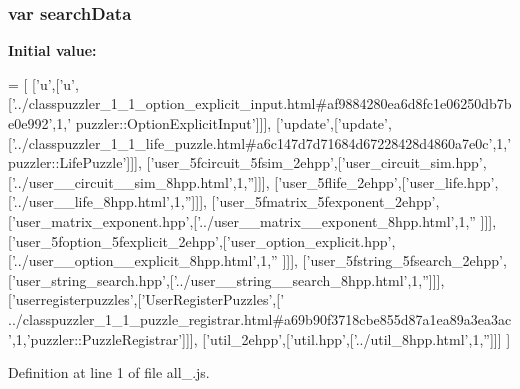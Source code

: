 \subsubsection[{search\+Data}]{\setlength{\rightskip}{0pt plus 5cm}var search\+Data}\label{a00043_ad01a7523f103d6242ef9b0451861231e}
{\bfseries Initial value\+:}
\begin{DoxyCode}
=
[
  [\textcolor{charliteral}{'u'},[\textcolor{charliteral}{'u'},[\textcolor{stringliteral}{'../classpuzzler\_1\_1\_option\_explicit\_input.html#af9884280ea6d8fc1e06250db7be0e992'},1,\textcolor{stringliteral}{'
      puzzler::OptionExplicitInput'}]]],
  [\textcolor{stringliteral}{'update'},[\textcolor{stringliteral}{'update'},[\textcolor{stringliteral}{'../classpuzzler\_1\_1\_life\_puzzle.html#a6c147d7d71684d67228428d4860a7e0c'},1,\textcolor{stringliteral}{'
      puzzler::LifePuzzle'}]]],
  [\textcolor{stringliteral}{'user\_5fcircuit\_5fsim\_2ehpp'},[\textcolor{stringliteral}{'user\_circuit\_sim.hpp'},[\textcolor{stringliteral}{'../user\_\_circuit\_\_sim\_8hpp.html'},1,\textcolor{stringliteral}{''}]]],
  [\textcolor{stringliteral}{'user\_5flife\_2ehpp'},[\textcolor{stringliteral}{'user\_life.hpp'},[\textcolor{stringliteral}{'../user\_\_life\_8hpp.html'},1,\textcolor{stringliteral}{''}]]],
  [\textcolor{stringliteral}{'user\_5fmatrix\_5fexponent\_2ehpp'},[\textcolor{stringliteral}{'user\_matrix\_exponent.hpp'},[\textcolor{stringliteral}{'../user\_\_matrix\_\_exponent\_8hpp.html'},1,\textcolor{stringliteral}{''}
      ]]],
  [\textcolor{stringliteral}{'user\_5foption\_5fexplicit\_2ehpp'},[\textcolor{stringliteral}{'user\_option\_explicit.hpp'},[\textcolor{stringliteral}{'../user\_\_option\_\_explicit\_8hpp.html'},1,\textcolor{stringliteral}{''}
      ]]],
  [\textcolor{stringliteral}{'user\_5fstring\_5fsearch\_2ehpp'},[\textcolor{stringliteral}{'user\_string\_search.hpp'},[\textcolor{stringliteral}{'../user\_\_string\_\_search\_8hpp.html'},1,\textcolor{stringliteral}{''}]]],
  [\textcolor{stringliteral}{'userregisterpuzzles'},[\textcolor{stringliteral}{'UserRegisterPuzzles'},[\textcolor{stringliteral}{'
      ../classpuzzler\_1\_1\_puzzle\_registrar.html#a69b90f3718cbe855d87a1ea89a3ea3ac'},1,\textcolor{stringliteral}{'puzzler::PuzzleRegistrar'}]]],
  [\textcolor{stringliteral}{'util\_2ehpp'},[\textcolor{stringliteral}{'util.hpp'},[\textcolor{stringliteral}{'../util\_8hpp.html'},1,\textcolor{stringliteral}{''}]]]
]
\end{DoxyCode}


Definition at line 1 of file all\+\_.\+js.

